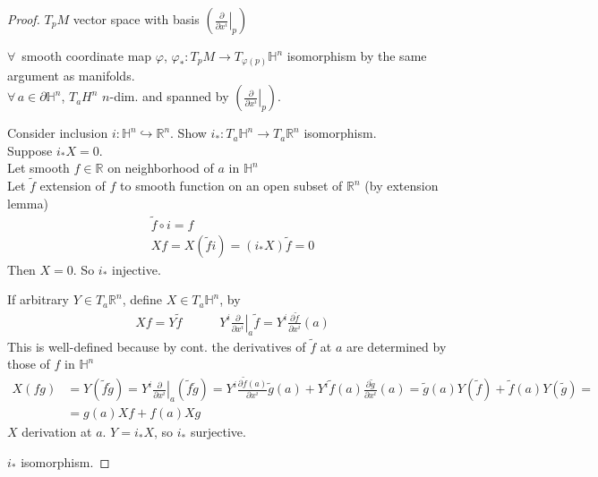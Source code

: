 \documentclass[11pt]{amsart}
\theoremstyle{definition}
\begin{document}
\begin{proof} $T_pM$ vector space with basis $\left( \left. \frac{ \partial }{ \partial x^i} \right|_p \right)$

$\forall \, $ smooth coordinate map $\varphi$, $\varphi_* : T_p M \to T_{ \varphi(p)} \mathbb{H}^n$ isomorphism by the same argument as manifolds.  \\
$\forall \, a \in \partial \mathbb{H}^n$, $T_a H^n$ $n$-dim. and spanned by $\left( \left. \frac{ \partial }{ \partial x^i } \right|_p \right)$.

Consider inclusion $i : \mathbb{H}^n \hookrightarrow \mathbb{R}^n$.  Show $i_*: T_a \mathbb{H}^n \to T_a \mathbb{R}^n$ isomorphism.  \\
Suppose $i_*X =0$.  \\
Let smooth $f \in \mathbb{R}$ on neighborhood of $a$ in $\mathbb{H}^n$ \\
Let $\widetilde{f}$ extension of $f$ to smooth function on an open subset of $\mathbb{R}^n$ (by extension lemma)
\[
\begin{gathered}
  \widetilde{f} \circ i = f \\
  Xf = X(\widetilde{f} i ) = (i_* X)\widetilde{f} = 0
\end{gathered}
\]
Then $X=0$.  So $i_*$ injective.

If arbitrary $Y \in T_a \mathbb{R}^n$, define $X \in T_a \mathbb{H}^n$, by
\[
\begin{gathered}
Xf = Y \widetilde{f} \quad \quad \quad Y^i \left. \frac{ \partial }{ \partial x^i} \right|_a \widetilde{f} = Y^i \frac{ \partial \widetilde{f}}{ \partial x^i}(a)
\end{gathered}
\]
This is well-defined because by cont. the derivatives of $\widetilde{f}$ at $a$ are determined by those of $f$ in $\mathbb{H}^n$
\[
\begin{aligned}
  X(fg) & = Y(\widetilde{f} \widetilde{g}) = Y^i \left. \frac{ \partial}{ \partial x^i} \right|_a (\widetilde{f} \widetilde{g}) = Y^i \frac{ \partial \widetilde{f}(a)}{ \partial x^i} \widetilde{g}(a)  + Y^i \widetilde{f}(a) \frac{ \partial \widetilde{g} }{ \partial x^i }(a) = \widetilde{g}(a) Y(\widetilde{f}) + \widetilde{f}(a) Y(\widetilde{g}) = \\
  & = g(a) Xf + f(a) Xg
\end{aligned}
\]
$X$ derivation at $a$.  $Y = i_* X$, so $i_*$ surjective.

$i_*$ isomorphism.


\end{proof}
\end{document}
